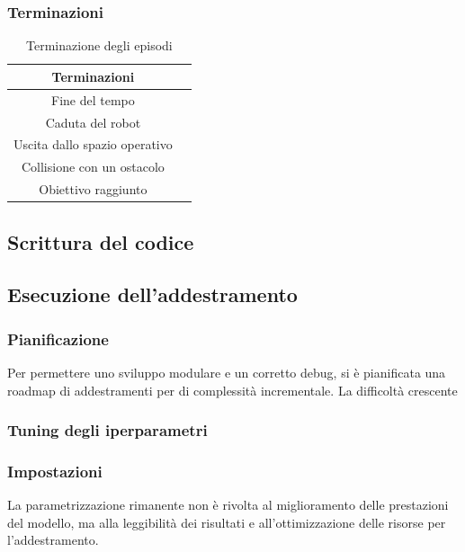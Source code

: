 \subsubsection{Terminazioni}

\begin{table}[h]
    \centering
    \begin{tabular}{|c|c|}
    \hline
    \textbf{Terminazioni}\\\hline
    Fine del tempo\\ \hline
    Caduta del robot\\ \hline
    Uscita dallo spazio operativo\\ \hline
    Collisione con un ostacolo\\ \hline
    Obiettivo raggiunto\\ \hline
    \end{tabular}
    \caption{Terminazione degli episodi}
    \label{tab:term}
\end{table}


\subsection{Scrittura del codice}


\subsection{Esecuzione dell'addestramento}
\subsubsection{Pianificazione}
Per permettere uno sviluppo modulare e un corretto debug, si è pianificata una roadmap di addestramenti per di complessità incrementale. La difficoltà crescente


\subsubsection{Tuning degli iperparametri}


\subsubsection{Impostazioni}
La parametrizzazione rimanente non è rivolta al miglioramento delle prestazioni del modello, ma alla leggibilità dei risultati e all'ottimizzazione delle risorse per l'addestramento. 



